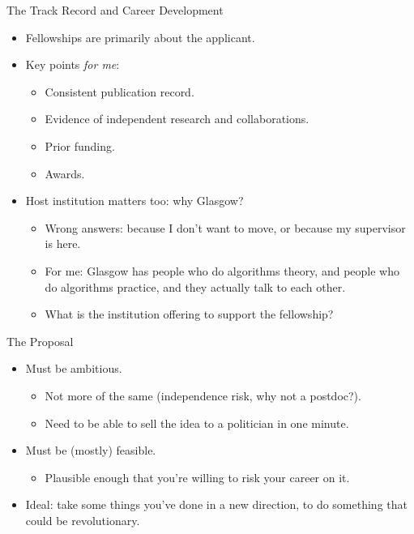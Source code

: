 \documentclass[aspectratio=169,compress,10pt]{beamer}
\begin{document}
\begin{frame}{The Track Record and Career Development}
    \begin{itemize}
        \item Fellowships are primarily about the applicant.
        \item Key points \emph{for me}:
            \begin{itemize}
                \item Consistent publication record.
                \item Evidence of independent research and collaborations.
                \item Prior funding.
                \item Awards.
            \end{itemize}
        \item Host institution matters too: why Glasgow?
            \begin{itemize}
                \item Wrong answers: because I don't want to move, or because my supervisor is here.
                \item For me: Glasgow has people who do algorithms theory, and people who do
                    algorithms practice, and they actually talk to each other.
                \item What is the institution offering to support the fellowship?
            \end{itemize}
    \end{itemize}
\end{frame}

\begin{frame}{The Proposal}
    \begin{itemize}
        \item Must be ambitious.
            \begin{itemize}
                \item Not more of the same (independence risk, why not a postdoc?).
                \item Need to be able to sell the idea to a politician in one minute.
            \end{itemize}
        \item Must be (mostly) feasible.
            \begin{itemize}
                \item Plausible enough that you're willing to risk your career on it.
            \end{itemize}
        \item Ideal: take some things you've done in a new direction, to do something
            that could be revolutionary.
    \end{itemize}
\end{frame}
\end{document}
